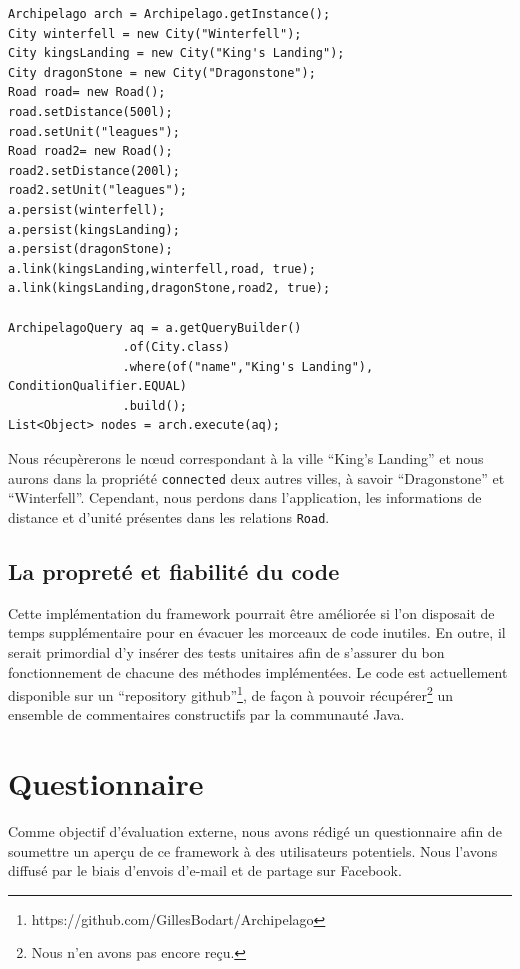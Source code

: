 \documentclass[a4paper,fleqn,12pt,oneside]{book}
\begin{document}
\begin{lstlisting}
Archipelago arch = Archipelago.getInstance();
City winterfell = new City("Winterfell");
City kingsLanding = new City("King's Landing");
City dragonStone = new City("Dragonstone");
Road road= new Road();
road.setDistance(500l);
road.setUnit("leagues");
Road road2= new Road();
road2.setDistance(200l);
road2.setUnit("leagues");
a.persist(winterfell);
a.persist(kingsLanding);
a.persist(dragonStone);
a.link(kingsLanding,winterfell,road, true);
a.link(kingsLanding,dragonStone,road2, true);

ArchipelagoQuery aq = a.getQueryBuilder()
                .of(City.class)
                .where(of("name","King's Landing"), ConditionQualifier.EQUAL)
                .build();
List<Object> nodes = arch.execute(aq);
\end{lstlisting}
\newpage
Nous récupèrerons le nœud correspondant à la ville \enquote{King's Landing} et nous aurons dans la propriété \texttt{connected} deux autres villes, à savoir \enquote{Dragonstone} et \enquote{Winterfell}. Cependant, nous perdons dans l'application, les informations de distance et d'unité présentes dans les relations \texttt{Road}.


\subsection{La propreté et fiabilité du code}

Cette implémentation du framework pourrait être améliorée si l'on disposait de temps supplémentaire pour en évacuer les morceaux de code inutiles. En outre, il serait primordial d'y insérer des tests unitaires afin de s'assurer du bon fonctionnement de chacune des méthodes implémentées.
\label{propreteDuCode}
Le code est actuellement disponible sur un \enquote{repository github}\footnote{https://github.com/GillesBodart/Archipelago}, de façon à pouvoir récupérer\footnote{Nous n'en avons pas encore reçu.} un ensemble de commentaires constructifs par la communauté Java. 

\section{Questionnaire}

Comme objectif d'évaluation externe, nous avons rédigé un questionnaire afin de soumettre un aperçu de ce framework à des utilisateurs potentiels. Nous l'avons diffusé par le biais d'envois d'e-mail et de partage sur Facebook.
\end{document}
